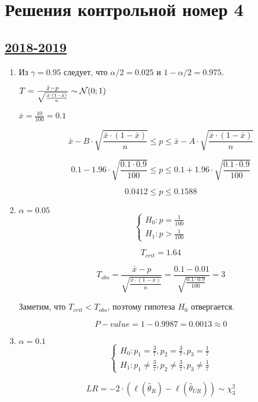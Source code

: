 \thispagestyle{empty}
\section{Решения контрольной номер 4}

\subsection[2018-2019]{\hyperref[sec:kr_04_2018_2019]{2018-2019}}
\label{sec:sol_kr_04_2018_2019}


\begin{enumerate} 
\item	
Из $\gamma = 0.95$ следует, что $\alpha / 2 = 0.025$ и $1 - \alpha / 2 = 0.975$.
	 
$T=\frac{\bar x - p}{\sqrt{\frac{\bar x \cdot (1 - \bar x) }{n}}}\sim \mathcal{N} (0;1)$
	
$\bar x = \frac{10}{100} = 0.1$

\[
\bar x - B \cdot \sqrt{\frac{\bar x \cdot (1 - \bar x) }{n}} \le p \le \bar x - A \cdot \sqrt{\frac{\bar x \cdot (1 - \bar x) }{n}}
\]

\[	
0.1 - 1.96 \cdot \sqrt{\frac{0.1 \cdot 0.9}{100}} \le p \le 0.1 + 1.96 \cdot \sqrt{\frac{0.1 \cdot 0.9}{100}}
\]

\[
0.0412 \le p \le 0.1588
\]
	
\item
$\alpha = 0.05$
\[
\begin{cases}
H_0: p = \frac{1}{100} \\
H_1: p > \frac{1}{100}
\end{cases}
\]
	
\[	
T_{crit} = 1.64
\]

\[
T_{obs} = \frac{\bar x - p}{\sqrt{\frac{\bar x \cdot (1 - \bar x) }{n}}} = \frac{0.1 - 0.01}{\sqrt{\frac{0.1 \cdot 0.9}{100}}} = 3 
\]

Заметим, что $T_{crit} < T_{obs}$, поэтому гипотеза $H_0$ отвергается.

\[
P-value = 1 - 0.9987 = 0.0013 \approx 0
\]
\item	
$\alpha = 0.1$	
\[
\begin{cases}
H_0: p_1 = \frac{3}{7}, p_2 = \frac{3}{7}, p_3 = \frac{1}{7} \\
H_1: p_1 \neq \frac{3}{7}, p_2 \neq \frac{3}{7}, p_3 \neq \frac{1}{7} 
\end{cases}
\]

\[	
LR = -2 \cdot (\ell(\hat \theta_R)-\ell(\hat \theta_{UR})) \sim \chi_3^2
\]


\end{enumerate}
